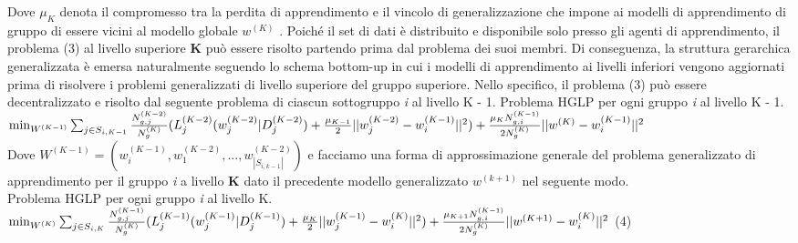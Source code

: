 Dove $\mu_K$ denota il compromesso tra la perdita di apprendimento e il vincolo di generalizzazione che impone ai modelli di apprendimento di gruppo di essere vicini al modello globale $w^{(K)}$ . Poiché il set di dati è distribuito e disponibile solo presso gli agenti di apprendimento, il problema (3) al livello superiore \textbf{K} può essere risolto partendo prima dal problema dei suoi membri. Di conseguenza, la struttura gerarchica generalizzata è emersa naturalmente seguendo lo schema bottom-up in cui i modelli di apprendimento ai livelli inferiori vengono aggiornati prima di risolvere i problemi generalizzati di livello superiore del gruppo superiore. Nello specifico, il problema (3) può essere decentralizzato e risolto dal seguente problema di ciascun sottogruppo \textsl{i} al livello K - 1.
Problema HGLP per ogni gruppo \textsl{i} al livello K - 1. \vspace{0.5cm}\\

$\min_{W^{(K-1)}}\sum_{j\in S_{i,K-1}} \frac{N_{g,j}^{(K-2)}}{N_g^{(K)}}(L_j^{(K-2)}(w_j^{(K-2)}|D_j^{(K-2)}) \vspace{0.5cm} +\frac{\mu_{K-1}}{2}||w_j^{(K-2)}-w_i^{(K-1)}||^2)+ \frac{\mu_{K}N_{g,i}^{(K-1)}}{2N_g^{(K)}}||w^{(K)}-w_i^{(K-1)}||^2$ \vspace{0.5cm}\\

Dove $W^{(K-1)} = (w_i^{(K-1)},w_1^{(K-2)},...,w_{|S_{i,k-1}|}^{(K-2)})$ e facciamo una forma di approssimazione generale del problema generalizzato di apprendimento per il gruppo \textsl{i} a livello \textbf{K} dato il precedente modello generalizzato $w^{(k+1)}$ nel seguente modo.\\
Problema HGLP per ogni gruppo \textsl{i} al livello K.\vspace{0.5cm}\\

$\min_{W^{(K)}}\sum_{j\in S_{i,K}} \frac{N_{g,j}^{(K-1)}}{N_g^{(K)}}(L_j^{(K-1)}(w_j^{(K-1)}|D_j^{(K-1)}) \vspace{0.5cm} \\ +\frac{\mu_{K}}{2}||w_j^{(K-1)}-w_i^{(K)}||^2)+ \frac{\mu_{K+1}N_{g,i}^{(K-1)}}{2N_g^{(K)}}||w^{(K+1)}-w_i^{(K)}||^2$ \hfill(4)\vspace{0.5cm} \\

